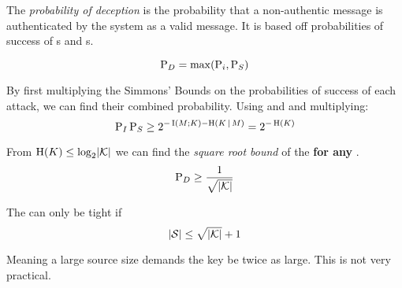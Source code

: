 \begin{definition}\label{def:Probability_of_Deception}
  The \emph{probability of deception} is the probability that a non-authentic message is authenticated by the  system as a valid message.
  It is based off probabilities of success of s and s.
  
  \begin{equation}\label{eq:Probability_of_Deception}
    \operatorname{\operatorname{P}}_{D} = \max(\operatorname{\operatorname{P}}_{i}, \operatorname{\operatorname{P}}_{S})
  \end{equation}
\end{definition}

\begin{theorem}\label{thm:Prob_Deception_Square_Root_Bound}
  By first multiplying the Simmons' Bounds on the probabilities of success of each attack, we can find their combined probability.
  Using  and  and multiplying:
  \begin{equation*}
    \operatorname{\operatorname{P}}_{I}\operatorname{\operatorname{P}}_{S} \geq 2^{-\operatorname{\operatorname{I}}(M; K) - \operatorname{\operatorname{H}}(K \operatorname{\vert} M)} = 2^{-\operatorname{\operatorname{H}}(K)}
  \end{equation*}

  From $\operatorname{\operatorname{H}}(K) \leq \log_{2} \lvert \operatorname{\mathcal{K}} \rvert$ we can find the \emph{square root bound} of the  \textbf{for any }.
  \begin{equation}\label{eq:Prob_Deception_Square_Root_Bound}
    \operatorname{\operatorname{P}}_{D} \geq \frac{1}{\sqrt{\lvert \operatorname{\mathcal{K}} \rvert}}
  \end{equation}
\end{theorem}

\begin{theorem}\label{thm:Prob_Deception_Square_Root_Bound_Tightness}
  The  can only be tight if
  \begin{equation}\label{eq:10}
    \lvert \operatorname{\mathcal{S}} \rvert \leq \sqrt{\lvert \operatorname{\mathcal{K}} \rvert} + 1
  \end{equation}

  Meaning a large source size demands the key be twice as large.
  This is not very practical.
\end{theorem}

